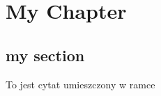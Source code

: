 \documentclass[10pt]{book}
\begin{document}
\chapter{My Chapter}

\section{my section}

{To jest cytat\cite{Puz2011a} umieszczony w ramce}


{}
\end{document}
